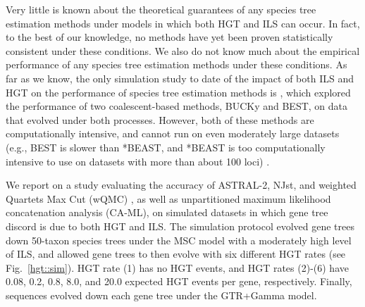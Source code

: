 
Very little is known about the
theoretical guarantees of any
species tree estimation methods under
models in which both HGT and ILS can occur.
In fact, to the best of our knowledge,
no methods have yet been proven statistically
consistent under these conditions.
We also do not know much about the empirical performance of
any species tree estimation methods under
these conditions.
As far as we know, the only simulation study to 
date of the impact of both ILS and HGT on 
the performance of species tree estimation methods is \cite{ChungAne},
which   explored  the performance of two coalescent-based methods, 
BUCKy  and BEST, on data that evolved 
under both processes. 
However, both
of these methods are computationally 
intensive, and cannot run on even moderately
large datasets
(e.g., BEST is slower than *BEAST, and *BEAST is
too computationally intensive to use on datasets with
more than about 100 loci)
\cite{Yang2011,bbca}.








We report
on a study evaluating
the accuracy  of 
ASTRAL-2, NJst, and 
weighted Quartets Max Cut (wQMC) \cite{wQMC}, as
well as  unpartitioned maximum likelihood concatenation analysis (CA-ML), 
on simulated datasets in which
gene tree discord is due to both HGT and ILS.
The simulation protocol evolved
gene trees down 50-taxon species trees under the MSC model with a moderately
high level of ILS, and allowed gene trees to then evolve with 
six different HGT rates (see Fig.~\ref{hgt::sim}). 
HGT rate (1) has no  HGT  events,
and 
HGT rates (2)-(6) have 0.08, 0.2, 0.8, 8.0, and
20.0  expected HGT events per gene, respectively.
Finally, sequences evolved down each gene tree under the GTR+Gamma model.

